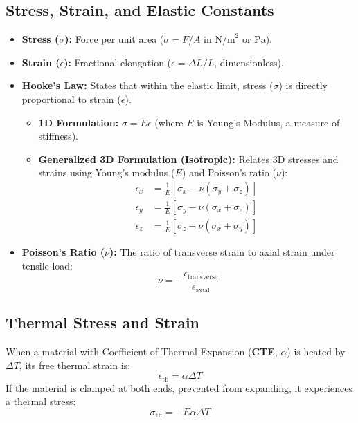 \documentclass[12pt,a4paper]{article}
\begin{document}
\subsection{Stress, Strain, and Elastic Constants}
\begin{itemize}[leftmargin=*, itemsep=3.5pt]
  \item \textbf{Stress ($\sigma$):} Force per unit area ($\sigma = F / A$ in $\text{N/m}^2$ or $\text{Pa}$).
  \item \textbf{Strain ($\epsilon$):} Fractional elongation ($\epsilon = \Delta L / L$, dimensionless).
  \item \textbf{Hooke's Law:} States that within the elastic limit, stress ($\sigma$) is directly proportional to strain ($\epsilon$).
    \begin{itemize}[leftmargin=*, itemsep=2.5pt, topsep=0pt]
      \item \textbf{1D Formulation:} $\sigma = E \epsilon$ (where $E$ is Young's Modulus, a measure of stiffness).
      \item \textbf{Generalized 3D Formulation (Isotropic):} Relates 3D stresses and strains using Young's modulus ($E$) and Poisson's ratio ($\nu$):
        \begin{align}
          \epsilon_x &= \frac{1}{E} \left[ \sigma_x - \nu(\sigma_y + \sigma_z) \right] \\
          \epsilon_y &= \frac{1}{E} \left[ \sigma_y - \nu(\sigma_x + \sigma_z) \right] \\
          \epsilon_z &= \frac{1}{E} \left[ \sigma_z - \nu(\sigma_x + \sigma_y) \right]
        \end{align}
    \end{itemize}
  \item \textbf{Poisson's Ratio ($\nu$):} The ratio of transverse strain to axial strain under tensile load:
    \begin{equation}
      \nu = -\frac{\epsilon_{\text{transverse}}}{\epsilon_{\text{axial}}}
    \end{equation}
\end{itemize}

\subsection{Thermal Stress and Strain}
When a material with Coefficient of Thermal Expansion (\textbf{CTE}, $\alpha$) is heated by $\Delta T$, its free thermal strain is:
$$\epsilon_{\text{th}} = \alpha \Delta T$$
If the material is clamped at both ends, prevented from expanding, it experiences a thermal stress:
$$\sigma_{\text{th}} = -E \alpha \Delta T$$
\end{document}

